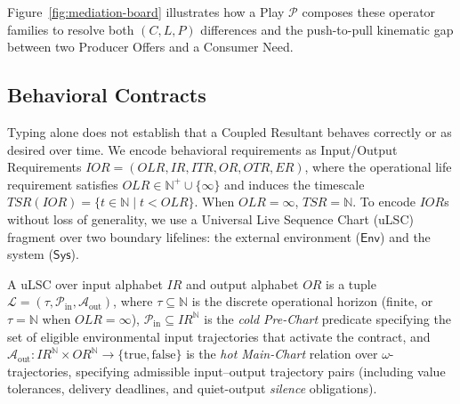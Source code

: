 Figure~\ref{fig:mediation-board} illustrates how a Play $\mathcal{P}$ composes these operator families to resolve both $(C, L, P)$ differences and the push-to-pull kinematic gap between two Producer Offers and a Consumer Need.

\subsection{Behavioral Contracts} \label{sec:meth-contracts}

Typing alone does not establish that a Coupled Resultant behaves correctly or as desired over time.  We encode behavioral requirements as Input/Output Requirements $IOR = (OLR, IR, ITR, OR, OTR, ER)$, where the operational life requirement satisfies $OLR \in \mathbb{N}^+ \cup \{\infty\}$ and induces the timescale $TSR(IOR) = \{t \in \mathbb{N} \mid t < OLR\}$.  When $OLR = \infty$, $TSR = \mathbb{N}$.  To encode $IOR$s without loss of generality, we use a Universal Live Sequence Chart (uLSC) fragment over two boundary lifelines: the external environment ($\mathsf{Env}$) and the system ($\mathsf{Sys}$).

\begin{definition} \label{def:ulsc}
A uLSC over input alphabet $IR$ and output alphabet $OR$ is a tuple $\mathcal{L} = (\tau, \mathcal{P}_{\text{in}}, \mathcal{A}_{\text{out}})$, where $\tau \subseteq \mathbb{N}$ is the discrete operational horizon (finite, or $\tau = \mathbb{N}$ when $OLR = \infty$), $\mathcal{P}_{\text{in}} \subseteq IR^{\mathbb{N}}$ is the \emph{cold Pre-Chart} predicate specifying the set of eligible environmental input trajectories that activate the contract, and $\mathcal{A}_{\text{out}} : IR^{\mathbb{N}} \times OR^{\mathbb{N}} \to \{\mathrm{true}, \mathrm{false}\}$ is the \emph{hot Main-Chart} relation over $\omega$-trajectories, specifying admissible input--output trajectory pairs (including value tolerances, delivery deadlines, and quiet-output \emph{silence} obligations).
\end{definition}

